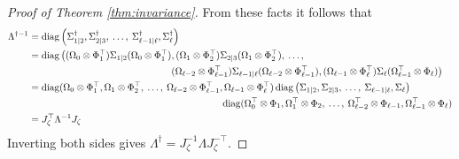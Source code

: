 \documentclass[12pt]{article}
\newcommand{\diag}{\operatorname{diag}}
\begin{document}
\begin{proof}[Proof of Theorem \ref{thm:invariance}]
From these facts it follows that
\begin{align*}
\Lambda^{\dagger-1} &= \diag\left( \Sigma_{1|2}^\dagger, \Sigma_{2|3}^\dagger, \: \ldots, \: \Sigma_{\ell-1|\ell}^\dagger, \Sigma_\ell^\dagger \right ) \\
&= \diag\left( (\Omega_0 \otimes \Phi_1^\top) \Sigma_{1|2} (\Omega_0 \otimes \Phi_1^\top), (\Omega_1 \otimes \Phi_2^\top) \Sigma_{2|3} (\Omega_1 \otimes \Phi_2^\top), \: \ldots, \right. \\
&\hspace{2in}\left. (\Omega_{\ell-2} \otimes \Phi_{\ell-1}^\top) \Sigma_{\ell-1|\ell} (\Omega_{\ell-2} \otimes \Phi_{\ell-1}^\top), (\Omega_{\ell-1} \otimes \Phi_\ell^\top) \Sigma_\ell (\Omega_{\ell-1}^\top \otimes \Phi_\ell) \right ) \\
&= \diag( \Omega_0 \otimes \Phi_1^\top, \Omega_1 \otimes \Phi_2^\top, \: \ldots, \: \Omega_{\ell-2} \otimes \Phi_{\ell-1}^\top,  \Omega_{\ell-1} \otimes \Phi_\ell^\top )  \diag\left( \Sigma_{1|2}, \Sigma_{2|3}, \: \ldots, \: \Sigma_{\ell-1|\ell}, \Sigma_\ell \right ) \\
&\hspace{2.75in}\diag( \Omega_0^\top \otimes \Phi_1, \Omega_1^\top \otimes \Phi_2, \: \ldots, \: \Omega_{\ell-2}^\top \otimes \Phi_{\ell-1},  \Omega_{\ell-1}^\top \otimes \Phi_\ell ) \\
&= J_\zeta^\top \Lambda^{-1} J_\zeta
\end{align*}
Inverting both sides gives $\Lambda^\dagger = J_\zeta^{-1} \Lambda J_\zeta^{-\top}$.


\end{proof}
\end{document}
